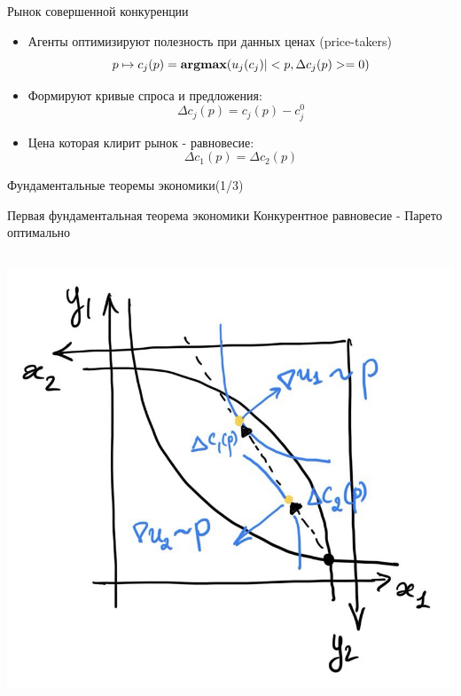 \documentclass{beamer}
\begin{document}
\begin{frame}{Рынок совершенной конкуренции}
\begin{itemize}
    \item Агенты оптимизируют полезность при данных ценах (price-takers)
    $$
    p \mapsto c_j(p) = \mathbf{argmax}( u_j(c_j)|  <p,\Delta c_j(p)>=0)   
    $$
    \item Формируют кривые спроса и предложения:
    $$
    \Delta c_j(p) = c_j(p) - c^0_j 
    $$
    \item Цена которая клирит рынок - равновесие:
    $$
    \Delta c_1(p) = \Delta c_2(p)
    $$
    
\end{itemize}


\end{frame}

\begin{frame}{Фундаментальные теоремы экономики(1/3)}


\begin{block}{Первая фундаментальная теорема экономики}
    Конкурентное равновесие - Парето оптимально
\end{block}
\begin{columns}
        \includegraphics[width=1.0\textwidth]{2_figs/edgeworth_1ft_neq.jpg}



\end{columns}
\end{frame}
\end{document}
